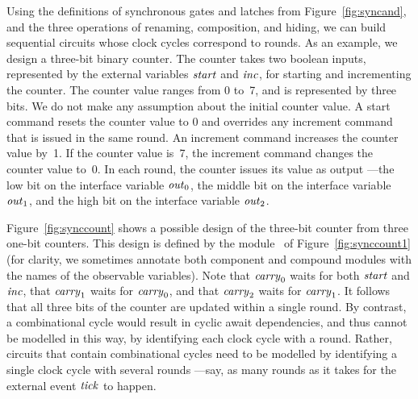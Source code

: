 \mypar
Using the definitions of synchronous gates and latches from
Figure~\ref{fig:syncand}, and the three operations of renaming, composition,
and hiding, we can build sequential circuits whose clock cycles correspond to
rounds.
As an example, we design a three-bit binary counter.
The counter takes two boolean inputs, represented by the external variables
${\it start\/}$ and ${\it inc\/}$, for starting and incrementing the counter.
The counter value ranges from 0 to~7, and is represented by three bits.
We do not make any assumption about the initial counter value.
A start command resets the counter value to 0 and overrides any increment
command that is issued in the same round.
An increment command increases the counter value by~1.
If the counter value is~7, the increment command changes the counter value
to~0.
In each round, the counter issues its value as output
---the low bit on the interface variable ${\it out\/}_0$, the middle bit on the
interface variable ${\it out\/}_1$, and the high bit on the interface variable
${\it out\/}_2$.

\mypar Figure~\ref{fig:synccount} shows a possible design of the
three-bit counter from three one-bit counters. This design is
defined by the module \SCountThree\ of Figure~\ref{fig:synccount1}
(for clarity, we sometimes annotate both component and compound
modules with the names of the observable variables). Note that
${\it carry\/}_0$ waits for both ${\it start\/}$ and ${\it inc\/}$, that ${\it carry\/}_1$
waits for ${\it carry\/}_0$, and that ${\it carry\/}_2$ waits for ${\it carry\/}_1$. It
follows that all three bits of the counter are updated within a
single round. By contrast, a combinational cycle would result in
cyclic await dependencies, and thus cannot be modelled in this
way, by identifying each clock cycle with a round. Rather,
circuits that contain combinational cycles need to be modelled by
identifying a single clock cycle with several rounds
---say, as many rounds as it takes for the external event ${\it tick\/}$ to happen.

